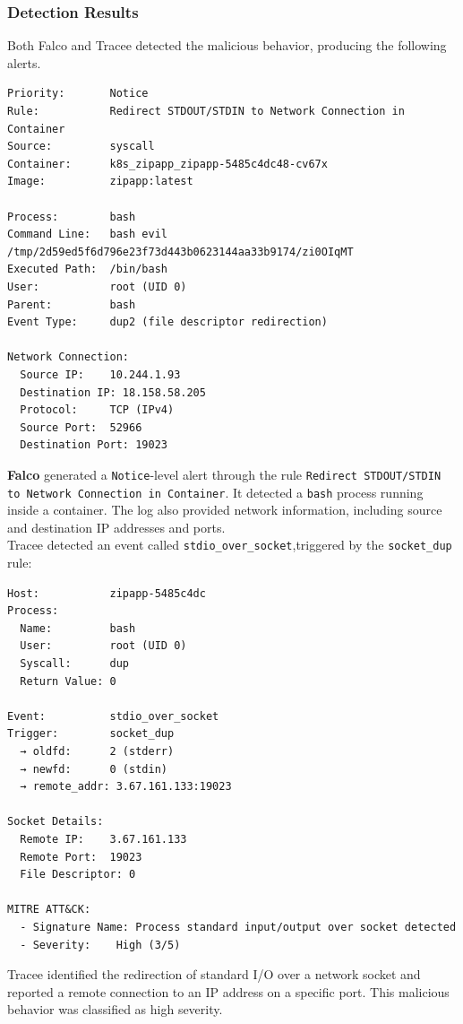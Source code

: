 \subsubsection{Detection Results}
Both Falco and Tracee detected the malicious behavior, producing the following alerts.
\begin{verbatim}
Priority:       Notice
Rule:           Redirect STDOUT/STDIN to Network Connection in Container
Source:         syscall
Container:      k8s_zipapp_zipapp-5485c4dc48-cv67x
Image:          zipapp:latest

Process:        bash         
Command Line:   bash evil /tmp/2d59ed5f6d796e23f73d443b0623144aa33b9174/zi0OIqMT
Executed Path:  /bin/bash
User:           root (UID 0)
Parent:         bash
Event Type:     dup2 (file descriptor redirection)

Network Connection:
  Source IP:    10.244.1.93
  Destination IP: 18.158.58.205
  Protocol:     TCP (IPv4)
  Source Port:  52966
  Destination Port: 19023
\end{verbatim}
\textbf{Falco} generated a \texttt{Notice}-level alert through the rule \texttt{Redirect STDOUT/STDIN to Network Connection in Container}. It detected a \texttt{bash} process running inside a container. The log also provided network information, including source and destination IP addresses and ports.\\
Tracee detected an event called \texttt{stdio\_over\_socket},triggered by the \texttt{socket\_dup} rule:
\begin{verbatim}
Host:           zipapp-5485c4dc
Process:
  Name:         bash
  User:         root (UID 0)
  Syscall:      dup
  Return Value: 0

Event:          stdio_over_socket
Trigger:        socket_dup
  → oldfd:      2 (stderr)
  → newfd:      0 (stdin)
  → remote_addr: 3.67.161.133:19023

Socket Details:
  Remote IP:    3.67.161.133
  Remote Port:  19023
  File Descriptor: 0

MITRE ATT&CK:
  - Signature Name: Process standard input/output over socket detected
  - Severity:    High (3/5)
\end{verbatim}
Tracee identified the redirection of standard I/O over a network socket and reported a remote connection to an IP address on a specific port. This malicious behavior was classified as high severity.


